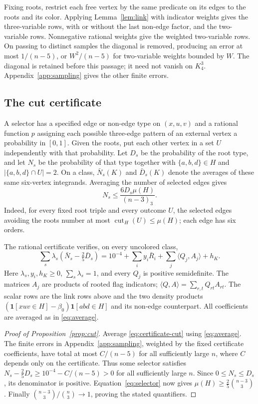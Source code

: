 \documentclass[11pt]{article}
\DeclareMathOperator{\cut}{cut}
\newcommand{\ind}{\mathbf 1}
\newcommand{\fall}[2]{(#1)_{#2}}
\begin{document}
Fixing roots, restrict each free vertex by the same predicate on its
edges to the roots and its color. Applying Lemma~\ref{lem:link} with
indicator weights gives the three-variable rows, with or without the
last non-edge factor, and the two-variable rows. Nonnegative rational
weights give the weighted two-variable rows. On passing to distinct
samples the diagonal is removed, producing an error at most
$1/(n-5)$, or $W^2/(n-5)$ for two-variable weights bounded by $W$.
The diagonal is retained before this passage; it need not vanish on
$K_4^3$. Appendix~\ref{app:sampling} gives the other finite errors.

\subsection*{The cut certificate}
A selector has a specified edge or non-edge type on $(x,u,v)$ and a
rational function $p$ assigning each possible three-edge pattern of an
external vertex a probability in $[0,1]$. Given the roots, put each other
vertex in a set $U$ independently with that probability. Let $D_s$ be
the probability of the root type, and let $N_s$ be the probability of
that type together with $\{a,b,d\}\in H$ and $|\{a,b,d\}\cap U|=2$.
On a class, $\bar N_s(K)$ and $\bar D_s(K)$ denote the averages of
these same six-vertex integrands. Averaging the number of selected edges gives
\begin{equation}\label{eq:selector}
  N_s\le\frac{6D_s\mu(H)}{\fall{n-3}{3}}.
\end{equation}
Indeed, for every fixed root triple and every outcome $U$, the selected
edges avoiding the roots number at most $\cut_H(U)\le\mu(H)$; each
edge has six orders.

The rational certificate verifies, on every uncolored class,
\begin{equation}\label{eq:certificate-cut}
 \sum_s\lambda_s(\bar N_s-\tfrac25\bar D_s)
 =10^{-4}+\sum_i y_i\bar R_i+
       \sum_j\langle Q_j,A_j\rangle+h_K.
\end{equation}
Here $\lambda_s,y_i,h_K\ge0$, $\sum_s\lambda_s=1$, and every $Q_j$
is positive semidefinite. The matrices $A_j$ are products of rooted flag
indicators; $\langle Q,A\rangle=\sum_{r,t}Q_{rt}A_{rt}$.
The scalar rows are the link rows above and the two density products
$(\ind[xuv\in H]-\beta_0)\ind[abd\in H]$ and its non-edge counterpart.
All coefficients are averaged as in \eqref{eq:average}.

\begin{proof}[Proof of Proposition~\ref{prop:cut}]
Average \eqref{eq:certificate-cut} using \eqref{eq:average}.
The finite errors in Appendix~\ref{app:sampling}, weighted by the fixed
certificate coefficients, have total at most $C/(n-5)$ for all
sufficiently large $n$, where $C$ depends only on the certificate.
Thus some selector satisfies
$N_s-\frac25D_s\ge10^{-4}-C/(n-5)>0$ for all sufficiently large $n$.
Since $0\le N_s\le D_s$, its denominator is positive.
Equation~\eqref{eq:selector} now gives
$\mu(H)\ge\frac25\binom{n-3}{3}$.
Finally $\binom{n-3}{3}/\binom n3\to1$, proving the stated quantifiers.
\end{proof}
\end{document}
